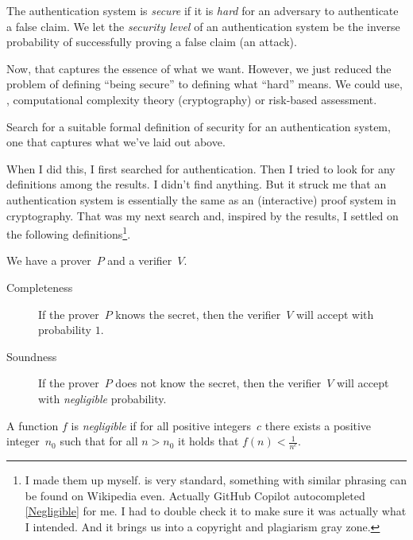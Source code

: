 \begin{frame}
\begin{definition}
  The authentication system is \emph{secure} if it is \emph{hard} for an 
  adversary to authenticate a false claim.
  We let the \emph{security level} of an authentication system be the inverse 
  probability of successfully proving a false claim (an attack).
\end{definition}
\end{frame}

Now, that captures the essence of what we want.
However, we just reduced the problem of defining \enquote{being secure} to 
defining what \enquote{hard} means.
We could use, \eg, computational complexity theory (cryptography) or risk-based 
assessment.

\begin{exercise}
  Search for a suitable formal definition of security for an authentication 
  system, one that captures what we've laid out above.
\end{exercise}

When I did this, I first searched for authentication.
Then I tried to look for any definitions among the results.
I didn't find anything.
But it struck me that an authentication system is essentially the same as an 
(interactive) proof system in cryptography.
That was my next search and, inspired by the results, I settled on the 
following definitions\footnote{%
   I made them up myself.
   is very standard, something with similar phrasing can be 
  found on Wikipedia even.
  Actually GitHub Copilot autocompleted \cref{Negligible} for me.
  I had to double check it to make sure it was actually what I intended.
  And it brings us into a copyright and plagiarism gray zone.
}.

\begin{frame}
\begin{definition}\label{FormalSecurity}
  We have a prover~\(P\) and a verifier~\(V\).
  \begin{description}
    \item[Completeness] If the prover~\(P\) knows the secret, then the 
      verifier~\(V\) will accept with probability \(1\).
    \item[Soundness] If the prover~\(P\) does not know the secret, then the 
      verifier~\(V\) will accept with \emph{negligible} probability.
  \end{description}
\end{definition}

\begin{definition}[Negligible]\label{Negligible}
  A function \(f\) is \emph{negligible} if for all positive integers~\(c\) 
  there exists a positive integer~\(n_0\) such that for all \(n > n_0\) it 
  holds that \(f(n) < \frac{1}{n^c}\).
\end{definition}
\end{frame}

